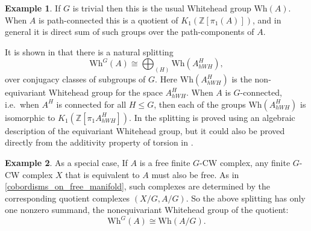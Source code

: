 \documentclass[11pt]{amsart}
\theoremstyle{definition}
\newtheorem{defn}{Definition}[section]
\newtheorem{exmp}{Example}[section]
\numberwithin{equation}{section}
\numberwithin{figure}{section}
\newcommand{\Z}{\mathbb Z}
\newcommand{\Wh}{\mathrm{Wh}}
\begin{document}


\begin{exmp}
If $G$ is trivial then this is the usual Whitehead group $\Wh(A)$. When $A$ is path-connected this is a quotient of $K_1(\Z[\pi_1(A)])$, and in general it is direct sum of such groups over the path-components of $A$.
\end{exmp}

It is shown in \cite[\S 14]{luck} that there is a natural splitting 
\begin{equation}\label{wh_splitting}
\Wh^G(A) \cong \bigoplus_{(H)} \Wh(A^H_{hWH}),
\end{equation}
over conjugacy classes of subgroups of $G$. Here $\Wh(A^H_{hWH})$ is the non-equivariant Whitehead group for the space $A^H_{hWH}$. When $A$ is $G$-connected, i.e.~when $A^H$ is connected for all $H \leq G$, then each of the groups $\Wh(A^H_{hWH})$ is isomorphic to $K_1(\Z[\pi_1 A^H_{hWH} ])$. In \cite[\S 14]{luck} the splitting is proved using an algebraic description of the equivariant Whitehead group, but it could also be proved directly from the additivity property of torsion in \cite[Thm 4.8]{luck}.

\begin{exmp}\label{whitehead_free_case}
	As a special case, If $A$ is a free finite $G$-CW complex, any finite $G$-CW complex $X$ that is equivalent to $A$ must also be free. As in \autoref{cobordisms_on_free_manifold}, such complexes are determined by the corresponding quotient complexes $(X/G,A/G)$. So the above splitting has only one nonzero summand, the nonequivariant Whitehead group of the quotient:
\[ \Wh^G(A) \cong \Wh(A/G). \]
\end{exmp}
\end{document}
